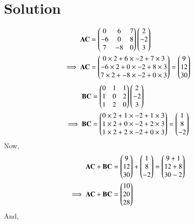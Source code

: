 \documentclass[journal,12pt,twocolumn]{IEEEtran}
\begin{document}
\section{Solution}
\begin{align}
    \mathbf{AC}&=\begin{pmatrix}0&6&7\\-6&0&8\\7&-8&0\end{pmatrix}\begin{pmatrix}2\\-2\\3\end{pmatrix}\\
    \implies \mathbf{AC}&=\begin{pmatrix}0\times2+6\times-2+7\times3\\-6\times2+0\times-2+8\times3\\7\times2+-8\times-2+0\times3\end{pmatrix}=\begin{pmatrix}9\\12\\30\end{pmatrix}
\end{align}
\begin{align}
    \mathbf{BC}&=\begin{pmatrix}0&1&1\\1&0&2\\1&2&0\end{pmatrix}\begin{pmatrix}2\\-2\\3\end{pmatrix}\\
    \implies \mathbf{BC}&=\begin{pmatrix}0\times2+1\times-2+1\times3\\1\times2+0\times-2+2\times3\\1\times2+2\times-2+0\times3\end{pmatrix}=\begin{pmatrix}1\\8\\-2\end{pmatrix}
\end{align}
Now,
\begin{align}
    \mathbf{AC}+\mathbf{BC}&=\begin{pmatrix}9\\12\\30\end{pmatrix}+\begin{pmatrix}1\\8\\-2\end{pmatrix}=\begin{pmatrix}9+1\\12+8\\30-2\end{pmatrix}\\
    \implies \mathbf{AC}+\mathbf{BC}&=\begin{pmatrix}10\\20\\28\end{pmatrix} \label{eq-2}
\end{align}
And,
\end{document}
